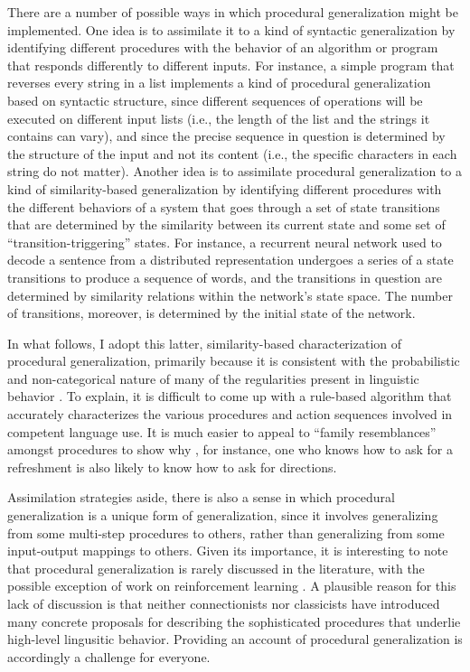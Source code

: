 There are a number of possible ways in which procedural generalization might be implemented. One idea is to assimilate it to a kind of syntactic generalization by identifying different procedures with the behavior of an algorithm or program that responds differently to different inputs. For instance, a simple program that reverses every string in a list implements a kind of procedural generalization based on syntactic structure, since different sequences of operations will be executed on different input lists (i.e., the length of the list and the strings it contains can vary), and since the precise sequence in question is determined by the structure of the input and not its content (i.e., the specific characters in each string do not matter). Another idea is to assimilate procedural generalization to a kind of similarity-based generalization by identifying different procedures with the different behaviors of a system that goes through a set of state transitions that are determined by the similarity between its current state and some set of ``transition-triggering'' states. For instance, a recurrent neural network used to decode a sentence from a distributed representation undergoes a series of a state transitions to produce a sequence of words, and the transitions in question are determined by similarity relations within the network's state space. The number of transitions, moreover, is determined by the initial state of the network.

In what follows, I adopt this latter, similarity-based characterization of procedural generalization, primarily because it is consistent with the probabilistic and non-categorical nature of many of the regularities present in linguistic behavior \citep{Seidenberg:1997,Manning:2015}. To explain, it is difficult to come up with a rule-based algorithm that accurately characterizes the various procedures and action sequences involved in competent language use. It is much easier to appeal to ``family resemblances'' amongst procedures to show why \citep{Wittgenstein:1953}, for instance, one who knows how to ask for a refreshment is also likely to know how to ask for directions.

Assimilation strategies aside, there is also a sense in which procedural generalization is a unique form of generalization, since it involves generalizing from some multi-step procedures to others, rather than generalizing from some input-output mappings to others. Given its importance, it is interesting to note that procedural generalization is rarely discussed in the literature, with the possible exception of work on reinforcement learning \citep[e.g.][]{Mnih:2015,Eliasmith:2012}. A plausible reason for this lack of discussion is that neither connectionists nor classicists have introduced many concrete proposals for describing the sophisticated procedures that underlie high-level lingusitic behavior. Providing an account of procedural generalization is accordingly a challenge for everyone. 

